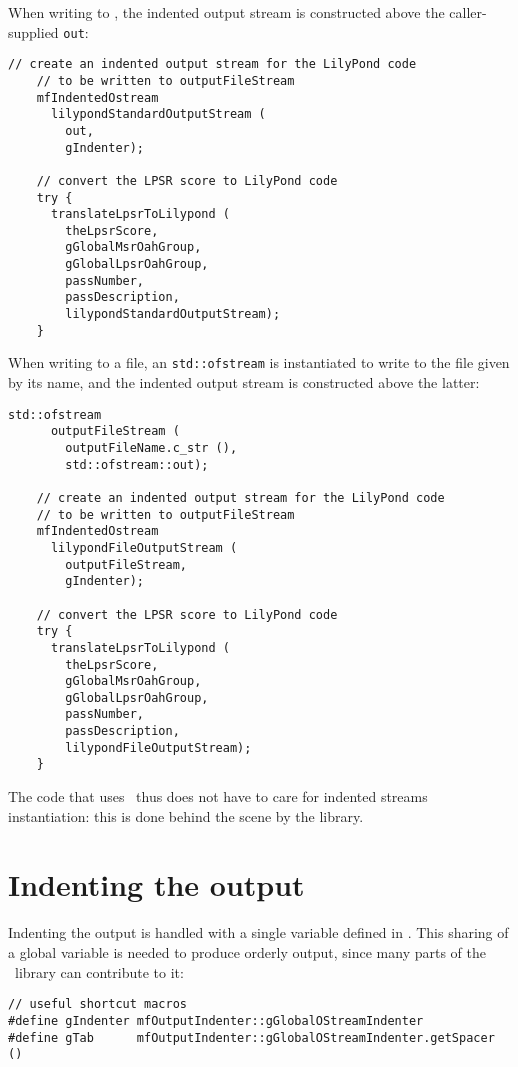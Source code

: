 When writing to \standardOutput, the indented output stream is constructed above the caller-supplied {\tt out}:
\begin{lstlisting}[language=CPlusPlus]
    // create an indented output stream for the LilyPond code
    // to be written to outputFileStream
    mfIndentedOstream
      lilypondStandardOutputStream (
        out,
        gIndenter);

    // convert the LPSR score to LilyPond code
    try {
      translateLpsrToLilypond (
        theLpsrScore,
        gGlobalMsrOahGroup,
        gGlobalLpsrOahGroup,
        passNumber,
        passDescription,
        lilypondStandardOutputStream);
    }
\end{lstlisting}

When writing to a file, an {\tt std::ofstream} is instantiated to write to the file given by its name, and the indented output stream is constructed above the latter:
\begin{lstlisting}[language=CPlusPlus]
     std::ofstream
      outputFileStream (
        outputFileName.c_str (),
        std::ofstream::out);

    // create an indented output stream for the LilyPond code
    // to be written to outputFileStream
    mfIndentedOstream
      lilypondFileOutputStream (
        outputFileStream,
        gIndenter);

    // convert the LPSR score to LilyPond code
    try {
      translateLpsrToLilypond (
        theLpsrScore,
        gGlobalMsrOahGroup,
        gGlobalLpsrOahGroup,
        passNumber,
        passDescription,
        lilypondFileOutputStream);
    }
\end{lstlisting}

The code that uses \mf\ thus does not have to care for indented streams instantiation: this is done behind the scene by the library.


\section{Indenting the output}

Indenting the output is handled with a single variable defined in .
This sharing of a global variable is needed to produce orderly output, since many parts of the \mf\ library can contribute to it:
\begin{lstlisting}[language=CPlusPlus]
// useful shortcut macros
#define gIndenter mfOutputIndenter::gGlobalOStreamIndenter
#define gTab      mfOutputIndenter::gGlobalOStreamIndenter.getSpacer ()
\end{lstlisting}

